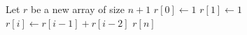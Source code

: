 \begin{algorithmic}
\State Let $r$ be a new array of size $n+1$
\State $r[0]\gets 1$
\State $r[1]\gets 1$
  \State $r[i]\gets r[i-1]+r[i-2]$
\EndFor
\State \Return $r[n]$
\EndFunction
\end{algorithmic}